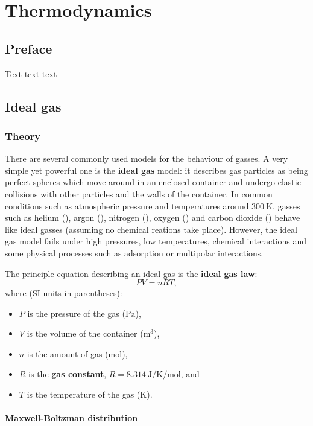 \chapter{Thermodynamics}

\section{Preface}
Text text text

\section{Ideal gas}
\subsection{Theory}
There are several commonly used models for the behaviour of gasses. A very simple yet powerful one is the \textbf{ideal gas} model: it describes gas particles as being perfect spheres which move around in an enclosed container and undergo elastic collisions with other particles and the walls of the container. In common conditions such as atmospheric pressure and temperatures around $\SI{300}{\kelvin}$, gasses such as helium (), argon (), nitrogen (), oxygen () and carbon dioxide () behave like ideal gasses (assuming no chemical reations take place). However, the ideal gas model fails under high pressures, low temperatures, chemical interactions and some physical processes such as adsorption or multipolar interactions.

The principle equation describing an ideal gas is the \textbf{ideal gas law}:
\begin{equation}
	PV = nRT,
	\label{eq:ideal_gas_law}
\end{equation}
where (SI units in parentheses):
\begin{itemize}
	\item $P$ is the pressure of the gas ($\si{\pascal}$),
	\item $V$ is the volume of the container ($\si{\cubic\metre}$),
	\item $n$ is the amount of gas ($\si{\mol}$),
	\item $R$ is the \textbf{gas constant}, $R=\SI{8.314}{\joule\per\kelvin\per\mol}$, and
	\item $T$ is the temperature of the gas ($\si{\kelvin}$).
\end{itemize}

\subsubsection{Maxwell-Boltzman distribution}
